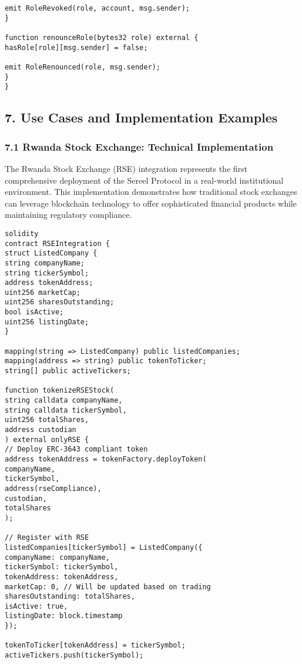 \documentclass[12pt]{article}
\begin{document}
{{{\begin{lstlisting}
emit RoleRevoked(role, account, msg.sender);
}

function renounceRole(bytes32 role) external {
hasRole[role][msg.sender] = false;

emit RoleRenounced(role, msg.sender);
}
}
\end{lstlisting}

\subsection{7. Use Cases and Implementation Examples} %

\subsubsection{7.1 Rwanda Stock Exchange: Technical Implementation} %

The Rwanda Stock Exchange (RSE) integration represents the first comprehensive deployment of the Sereel Protocol in a real-world institutional environment. This implementation demonstrates how traditional stock exchanges can leverage blockchain technology to offer sophisticated financial products while maintaining regulatory compliance.



\begin{lstlisting}
solidity
contract RSEIntegration {
struct ListedCompany {
string companyName;
string tickerSymbol;
address tokenAddress;
uint256 marketCap;
uint256 sharesOutstanding;
bool isActive;
uint256 listingDate;
}

mapping(string => ListedCompany) public listedCompanies;
mapping(address => string) public tokenToTicker;
string[] public activeTickers;

function tokenizeRSEStock(
string calldata companyName,
string calldata tickerSymbol,
uint256 totalShares,
address custodian
) external onlyRSE {
// Deploy ERC-3643 compliant token
address tokenAddress = tokenFactory.deployToken(
companyName,
tickerSymbol,
address(rseCompliance),
custodian,
totalShares
);

// Register with RSE
listedCompanies[tickerSymbol] = ListedCompany({
companyName: companyName,
tickerSymbol: tickerSymbol,
tokenAddress: tokenAddress,
marketCap: 0, // Will be updated based on trading
sharesOutstanding: totalShares,
isActive: true,
listingDate: block.timestamp
});

tokenToTicker[tokenAddress] = tickerSymbol;
activeTickers.push(tickerSymbol);


\end{lstlisting}}}}
\end{document}
